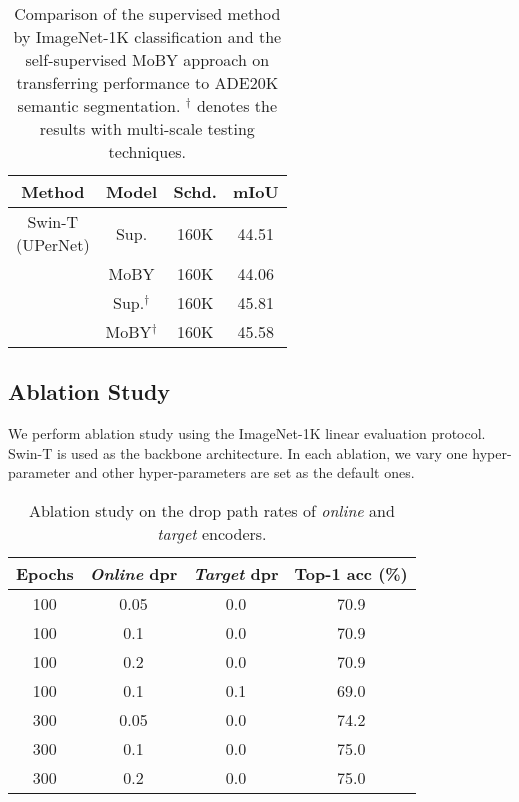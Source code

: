 \documentclass{article}
\begin{document}
\begin{table}[h]
  \centering
  \begin{tabular}{cccc}
    \toprule
    Method & Model & Schd.
    & mIoU \\
    \midrule
    \multirowcell{4}{Swin-T\\(UPerNet)}
    & Sup. & 160K & 44.51 \\
    & MoBY & 160K & 44.06 \\
    \cmidrule{2-4}
    & Sup.$^{\dag}$ & 160K & 45.81 \\
    & MoBY$^{\dag}$ & 160K & 45.58 \\
    \bottomrule
  \end{tabular}
  \caption{Comparison of the supervised method by ImageNet-1K classification and the self-supervised MoBY approach on transferring performance to ADE20K semantic segmentation. $^{\dag}$ denotes the results with multi-scale testing techniques.}
  \label{tab-ade20k}
\end{table}

\subsection{Ablation Study}

We perform ablation study using the ImageNet-1K linear evaluation protocol. Swin-T is used as the backbone architecture. In each ablation, we vary one hyper-parameter and other hyper-parameters are set as the default ones.

\begin{table}[h]
  \centering
  \begin{tabular}{cccc}
    \toprule
    Epochs & \emph{Online} dpr & \emph{Target} dpr & Top-1 acc (\%) \\
    \midrule
    100 & 0.05 & 0.0 & 70.9 \\
    100 & 0.1  & 0.0 & 70.9 \\
    100 & 0.2  & 0.0 & 70.9 \\
    100 & 0.1  & 0.1 & 69.0 \\
    \midrule
    300 & 0.05 & 0.0 & 74.2 \\
    300 & 0.1  & 0.0 & 75.0 \\
    300 & 0.2  & 0.0 & 75.0 \\
    \bottomrule
  \end{tabular}
  \caption{Ablation study on the drop path rates of \emph{online} and \emph{target} encoders.}
  \label{tab-ablation-droppath}
\end{table}
\end{document}
